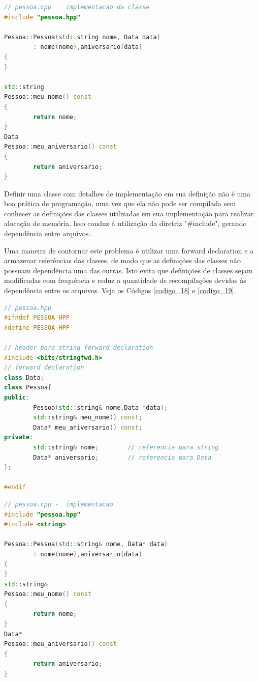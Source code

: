 \begin{lstlisting}[language=C++,frame=single,title={Código 17: 
                          Arquivo definição da classe Pessoa },
                                                label=codigo_17]
// pessoa.cpp    implementacao da classe
#include "pessoa.hpp"

Pessoa::Pessoa(std::string nome, Data data)
        : nome(nome),aniversario(data)
{
}

std::string
Pessoa::meu_nome() const
{
        return nome;
}
Data
Pessoa::meu_aniversario() const
{
        return aniversario;
}

\end{lstlisting}    



Definir uma classe com detalhes de implementação em sua definição não é uma
 boa prática de programação, uma vez que ela não pode ser compilada sem
 conhecer as definições das classes utilizadas em sua implementação para
 realizar alocação de memória. Isso conduz à utilização da diretriz
 "\#include", gerando dependência entre arquivos.\cite{ref44}

Uma maneira de contornar este problema é utilizar uma forward declaration e a
 armazenar referências das classes, de modo que as definições das classes não
 possuam dependência uma das outras. Isto evita que definições de classes sejam
 modificadas com frequência e reduz a quantidade de recompilações devidas às
 dependência entre os  arquivos. Veja os Códigos \ref{codigo_18} 
e \ref{codigo_19}.


\begin{lstlisting}[language=C++,frame=single,title={Código 18: 
                          Arquivo definição da classe Pessoa,       
                      utilizando \textit{forward declaration} },
                                                label=codigo_18]
// pessoa.hpp 
#ifndef PESSOA_HPP
#define PESSOA_HPP

// header para string forward declaration
#include <bits/stringfwd.h>    
// forward declaration
class Data;            
class Pessoa{
public:
        Pessoa(std::string& nome,Data *data);
        std::string& meu_nome() const;
        Data* meu_aniversario() const;
private:
        std::string& nome;        // referencia para string
        Data* aniversario;        // referencia para Data
};

#endif
\end{lstlisting}


\begin{lstlisting}[language=C++,frame=single,title={Código 19: 
                          Arquivo definição da classe Pessoa,       
                      utilizando \textit{forward declaration} },
                                                label=codigo_19]
// pessoa.cpp -  implementacao
#include "pessoa.hpp"
#include <string>

Pessoa::Pessoa(std::string& nome, Data* data)
        : nome(nome),aniversario(data)
{
}
std::string&
Pessoa::meu_nome() const
{
        return nome;
}
Data*
Pessoa::meu_aniversario() const
{
        return aniversario;
}
\end{lstlisting}


